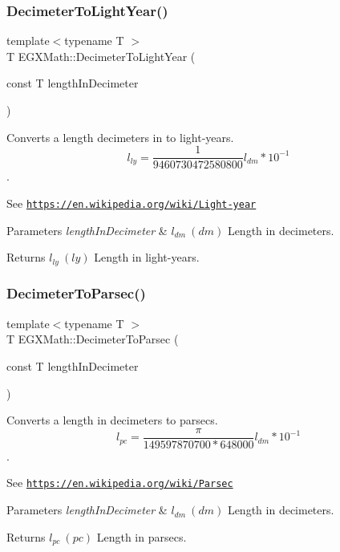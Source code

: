 \subsubsection{\texorpdfstring{Decimeter\+To\+Light\+Year()}{DecimeterToLightYear()}}
{\footnotesize\ttfamily template$<$typename T $>$ \\
T E\+G\+X\+Math\+::\+Decimeter\+To\+Light\+Year (\begin{DoxyParamCaption}\item[{const T}]{length\+In\+Decimeter }\end{DoxyParamCaption})}



Converts a length decimeters in to light-\/years. \[ l_{ly}= \frac{1}{9460730472580800} l_{dm} * 10^{-1} \]. 

See \href{https://en.wikipedia.org/wiki/Light-year}{\tt https\+://en.\+wikipedia.\+org/wiki/\+Light-\/year} 
\begin{DoxyParams}{Parameters}
{\em length\+In\+Decimeter} & $ l_{dm}\ (dm)$ Length in decimeters. \\
\hline
\end{DoxyParams}
\begin{DoxyReturn}{Returns}
$ l_{ly}\ (ly)$ Length in light-\/years. 
\end{DoxyReturn}
\mbox{\label{group___e_g_x_math-_conversions-_length_conversions-_s_i-_decimeter-_astronomical_gad84954082a6648312ce4fc52d1e4d8eb}} 
\subsubsection{\texorpdfstring{Decimeter\+To\+Parsec()}{DecimeterToParsec()}}
{\footnotesize\ttfamily template$<$typename T $>$ \\
T E\+G\+X\+Math\+::\+Decimeter\+To\+Parsec (\begin{DoxyParamCaption}\item[{const T}]{length\+In\+Decimeter }\end{DoxyParamCaption})}



Converts a length in decimeters to parsecs. \[ l_{pc}=\frac{\pi}{149597870700 * 648000} l_{dm} * 10^{-1} \]. 

See \href{https://en.wikipedia.org/wiki/Parsec}{\tt https\+://en.\+wikipedia.\+org/wiki/\+Parsec} 
\begin{DoxyParams}{Parameters}
{\em length\+In\+Decimeter} & $ l_{dm}\ (dm)$ Length in decimeters. \\
\hline
\end{DoxyParams}
\begin{DoxyReturn}{Returns}
$ l_{pc}\ (pc)$ Length in parsecs. 
\end{DoxyReturn}
